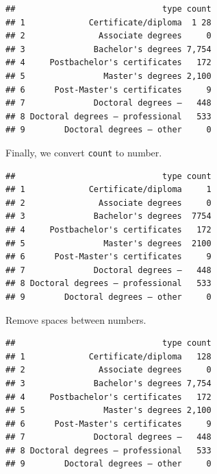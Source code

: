 \documentclass[
]{book}
\newenvironment{Shaded}{\begin{snugshade}}{\end{snugshade}}
\newcommand{\CharTok}[1]{\textcolor[rgb]{0.31,0.60,0.02}{#1}}
\newcommand{\CommentTok}[1]{\textcolor[rgb]{0.56,0.35,0.01}{\textit{#1}}}
\newcommand{\DataTypeTok}[1]{\textcolor[rgb]{0.13,0.29,0.53}{#1}}
\newcommand{\KeywordTok}[1]{\textcolor[rgb]{0.13,0.29,0.53}{\textbf{#1}}}
\newcommand{\NormalTok}[1]{#1}
\newcommand{\OperatorTok}[1]{\textcolor[rgb]{0.81,0.36,0.00}{\textbf{#1}}}
\newcommand{\StringTok}[1]{\textcolor[rgb]{0.31,0.60,0.02}{#1}}
\begin{document}
\begin{verbatim}
##                              type count
## 1             Certificate/diploma  1 28
## 2               Associate degrees     0
## 3              Bachelor's degrees 7,754
## 4     Postbachelor's certificates   172
## 5                Master's degrees 2,100
## 6      Post-Master's certificates     9
## 7              Doctoral degrees –   448
## 8 Doctoral degrees – professional   533
## 9        Doctoral degrees – other     0
\end{verbatim}

Finally, we convert \texttt{count} to number.

\begin{Shaded}
\end{Shaded}

\begin{verbatim}
##                              type count
## 1             Certificate/diploma     1
## 2               Associate degrees     0
## 3              Bachelor's degrees  7754
## 4     Postbachelor's certificates   172
## 5                Master's degrees  2100
## 6      Post-Master's certificates     9
## 7              Doctoral degrees –   448
## 8 Doctoral degrees – professional   533
## 9        Doctoral degrees – other     0
\end{verbatim}

Remove spaces between numbers.

\begin{Shaded}
\end{Shaded}

\begin{verbatim}
##                              type count
## 1             Certificate/diploma   128
## 2               Associate degrees     0
## 3              Bachelor's degrees 7,754
## 4     Postbachelor's certificates   172
## 5                Master's degrees 2,100
## 6      Post-Master's certificates     9
## 7              Doctoral degrees –   448
## 8 Doctoral degrees – professional   533
## 9        Doctoral degrees – other     0
\end{verbatim}
\end{document}
